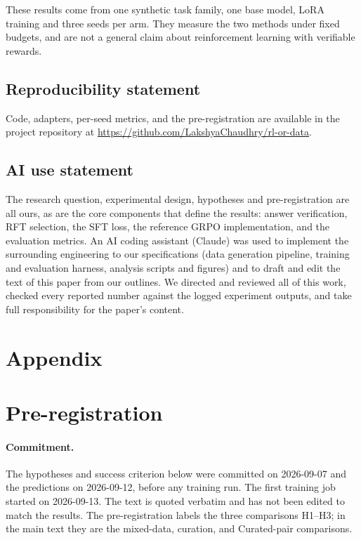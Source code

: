 \documentclass{article}
\begin{document}
These results come from one synthetic task family, one base model, LoRA training and three seeds per arm. They measure the two methods under fixed budgets, and are not a general claim about reinforcement learning with verifiable rewards.

\subsection*{Reproducibility statement}
Code, adapters, per-seed metrics, and the pre-registration are available in the project repository at \mbox{\url{https://github.com/LakshyaChaudhry/rl-or-data}}.

\subsection*{AI use statement}
The research question, experimental design, hypotheses and pre-registration are all ours, as are the core components that define the results: answer verification, RFT selection, the SFT loss, the reference GRPO implementation, and the evaluation metrics. An AI coding assistant (Claude) was used to implement the surrounding engineering to our specifications (data generation pipeline, training and evaluation harness, analysis scripts and figures) and to draft and edit the text of this paper from our outlines. We directed and reviewed all of this work, checked every reported number against the logged experiment outputs, and take full responsibility for the paper's content.




\appendix

\section*{Appendix}
\section{Pre-registration}
\label{app:prereg}

\paragraph{Commitment.} The hypotheses and success criterion below were committed on 2026-09-07 and the predictions on 2026-09-12, before any training run. The first training job started on 2026-09-13. The text is quoted verbatim and has not been edited to match the results. The pre-registration labels the three comparisons H1--H3; in the main text they are the mixed-data, curation, and Curated-pair comparisons.
\end{document}
